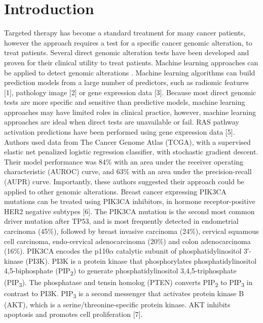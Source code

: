 \documentclass[10pt,letterpaper]{article}
\begin{document}

\linenumbers

\hypertarget{introduction}{%
\section{Introduction}\label{introduction}}

Targeted therapy has become a standard treatment for many cancer
patients, however the approach requires a test for a specific cancer
genomic alteration, to treat patients. Several direct genomic alteration
tests have been developed and proven for their clinical utility to treat
patients. Machine learning approaches can be applied to detect genomic
alterations . Machine learning algorithms can build prediction models
from a large number of predictors, such as radiomic features {[}1{]},
pathology image {[}2{]} or gene expression data {[}3{]}. Because most
direct genomic tests are more specific and sensitive than predictive
models, machine learning approaches may have limited roles in clinical
practice, however, machine learning approaches are ideal when direct
tests are unavailable or fail. RAS pathway activation predictions have
been performed using gene expression data {[}5{]}. Authors used data
from The Cancer Genome Atlas (TCGA), with a supervised elastic net
penalized logistic regression classifier, with stochastic gradient
descent. Their model performance was 84\% with an area under the
receiver operating characteristic (AUROC) curve, and 63\% with an area
under the precision-recall (AUPR) curve. Importantly, these authors
suggested their approach could be applied to other genomic alterations.
Breast cancer expressing PIK3CA mutations can be treated using PIK3CA
inhibitors, in hormone receptor-positive HER2 negative subtypes {[}6{]}.
The PIK3CA mutation is the second most common driver mutation after
TP53, and is most frequently detected in endometrial carcinoma (45\%),
followed by breast invasive carcinoma (24\%), cervical squamous cell
carcinoma, endo-cervical adenocarcinoma (20\%) and colon adenocarcinoma
(16\%). PIK3CA encodes the p110\(\alpha\) catalytic subunit of
phosphatidylinositol 3′-kinase (PI3K). PI3K is a protein kinase that
phosphorylates phosphatidylinositol 4,5-biphosphate
(PIP\textsubscript{2}) to generate phosphatidylinositol
3,4,5-triphosphate (PIP\textsubscript{3}). The phosphatase and tensin
homolog (PTEN) converts PIP\textsubscript{2} to PIP\textsubscript{3} in
contrast to PI3K. PIP\textsubscript{3} is a second messenger that
activates protein kinase B (AKT), which is a serine/threonine-specific
protein kinase. AKT inhibits apoptosis and promotes cell proliferation
{[}7{]}.
\end{document}
